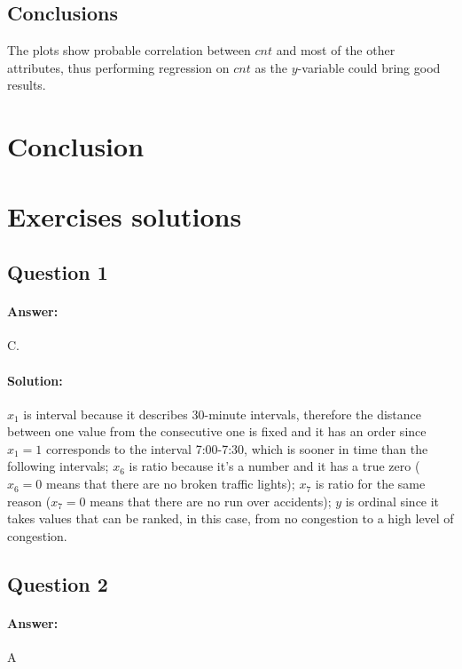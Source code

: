 \documentclass[11pt,a4paper]{article}
\begin{document}
\subsection{Conclusions}

The plots show probable correlation between $cnt$ and most of the other attributes, thus performing regression on $cnt$ as the $y$-variable could bring good results.






\section{Conclusion}


\section{Exercises solutions}

\subsection{Question 1}

\paragraph*{Answer:} C.
\paragraph*{Solution:} 
$x_1$ is interval because it describes 30-minute intervals, therefore the distance between one value from the consecutive one is fixed and it has an order since $x_1 = 1$ corresponds to the interval 7:00-7:30, which is sooner in time than the following intervals; $x_6$ is ratio because it's a number and it has a true zero ($x_6 = 0$ means that there are no broken traffic lights); $x_7$ is ratio for the same reason ($x_7 = 0$ means that there are no run over accidents); $y$ is ordinal since it takes values that can be ranked, in this case, from no congestion to a high level of congestion.

\subsection{Question 2}

\paragraph*{Answer:} A
\end{document}

